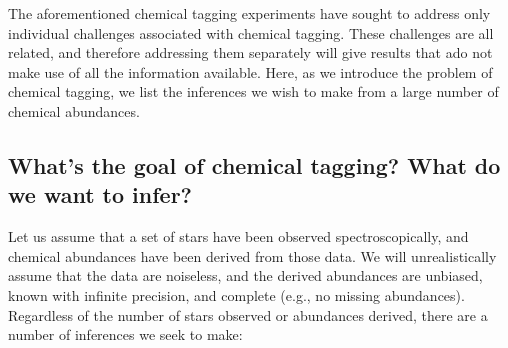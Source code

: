 \documentclass{aastex61}
\begin{document}
The aforementioned chemical tagging experiments have sought to address only 
individual challenges associated with chemical tagging.
These challenges are all related, and therefore addressing them separately
will give results that ado not make use of all
the information available. 
Here, as we introduce the problem of chemical tagging, we list the inferences
we wish to make from a large number of chemical abundances.


\subsection{What's the goal of chemical tagging? What do we want to infer?}
\label{sec:the-problem}


Let us assume that a set of stars have been observed spectroscopically, and
chemical abundances have been derived from those data.
We will unrealistically assume that the data are noiseless, and the derived
abundances are unbiased, known with infinite precision, and complete (e.g., no 
missing abundances).
Regardless of the number of stars observed or abundances derived, there are a
number of inferences we seek to make:
\end{document}
